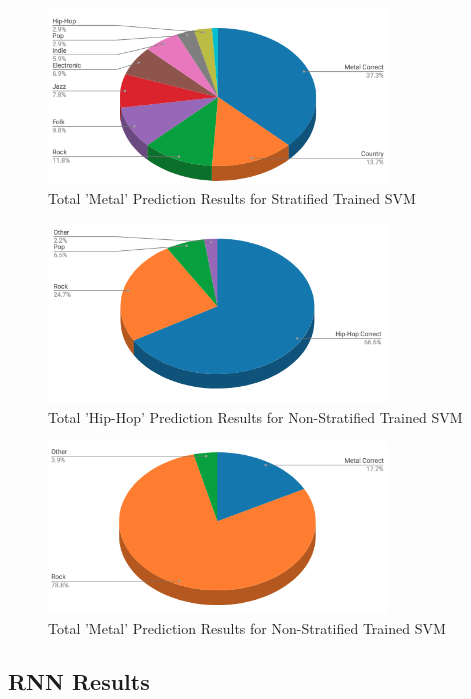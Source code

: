 \documentclass[journal]{IEEEtran}
\begin{document}
\begin{figure}[h!]
\centering
\includegraphics[width=9cm]{Figure_6}
\caption{Total 'Metal' Prediction Results for Stratified Trained SVM}
\end{figure}

\begin{figure}[h!]
\centering
\includegraphics[width=9cm]{Figure_2}
\caption{Total 'Hip-Hop' Prediction Results for Non-Stratified Trained SVM}
\end{figure}

\begin{figure}[h!]
\centering
\includegraphics[width=9cm]{Figure_3}
\caption{Total 'Metal' Prediction Results for Non-Stratified Trained SVM}
\end{figure}

\newpage
\subsection{RNN Results}
\end{document}
